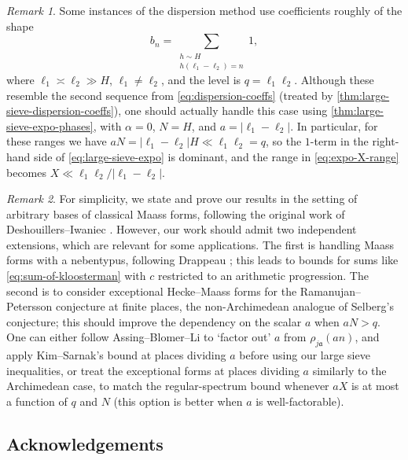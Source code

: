 \documentclass[reqno,11pt]{amsart}
\theoremstyle{remark}
\newtheorem*{remark}{Remark}
\numberwithin{equation}{section}
\newcommand{\ma}{\mathfrak{a}}
\begin{document}
\begin{remark}
Some instances of the dispersion method \cite{drappeau2023one,drappeau2017sums,assing2021uniform} use coefficients roughly of the shape
\begin{equation} \label{eq:third-type-disp}
    b_n = \sum_{\substack{h \sim H \\ h(\ell_1-\ell_2) = n}} 1,
\end{equation}
where $\ell_1 \asymp \ell_2 \gg H$, $\ell_1 \neq \ell_2$, and the level is $q = \ell_1 \ell_2$. Although these resemble the second sequence from \cref{eq:dispersion-coeffs} (treated by \cref{thm:large-sieve-dispersion-coeffs}), one should actually handle this case using \cref{thm:large-sieve-expo-phases}, with $\alpha = 0$, $N = H$, and $a = |\ell_1 - \ell_2|$. In particular, for these ranges we have $aN = |\ell_1-\ell_2|H \ll \ell_1\ell_2 = q$, so the $1$-term in the right-hand side of \cref{eq:large-sieve-expo} is dominant, and the range in \cref{eq:expo-X-range} becomes $X \ll \ell_1\ell_2/|\ell_1 - \ell_2|$.
\end{remark}

\begin{remark}
For simplicity, we state and prove our results in the setting of arbitrary bases of classical Maass forms, following the original work of Deshouillers--Iwaniec \cite{deshouillers1982kloosterman}. However, our work should admit two independent extensions, which are relevant for some applications. The first is handling Maass forms with a nebentypus, following Drappeau \cite{drappeau2017sums}; this leads to bounds for sums like \cref{eq:sum-of-kloosterman} with $c$ restricted to an arithmetic progression. The second is to consider exceptional Hecke--Maass forms for the Ramanujan--Petersson conjecture at finite places, the non-Archimedean analogue of Selberg's conjecture; this should improve the dependency on the scalar $a$ when $aN > q$. One can either follow Assing--Blomer--Li \cite{assing2021uniform} to `factor out' $a$ from $\rho_{j\ma}(an)$, and apply Kim--Sarnak's bound at places dividing $a$ \cite{kim2003functoriality} before using our large sieve inequalities, or treat the exceptional forms at places dividing $a$ similarly to the Archimedean case, to match the regular-spectrum bound whenever $aX$ is at most a function of $q$ and $N$ (this option is better when $a$ is well-factorable).
\end{remark}


\subsection{Acknowledgements}
\end{document}
